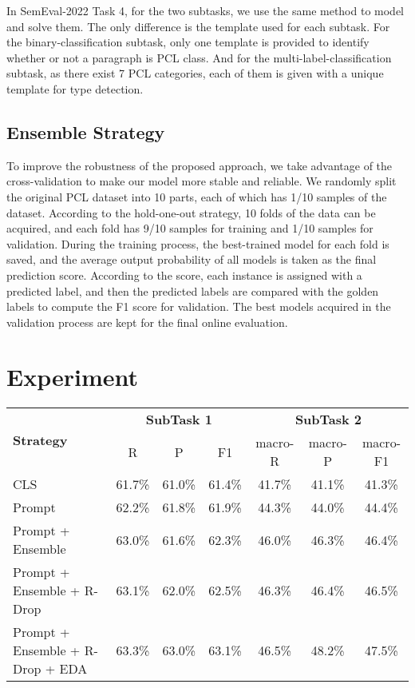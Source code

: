 \documentclass[11pt]{article}
\begin{document}
In SemEval-2022 Task 4, for the two subtasks, we use the same method to model and solve them.
The only difference is the template used for each subtask.
For the binary-classification subtask, only one template is provided to identify whether or not a paragraph is PCL class.
And for the multi-label-classification subtask, as there exist 7 PCL categories,  each of them is given with a unique template for type detection. 

\subsection{Ensemble Strategy}\label{ensemble}
To improve the robustness of the proposed approach, we take advantage of the cross-validation to make our model more stable and reliable. 
We randomly split the original PCL dataset into 10 parts, each of which has 1/10 samples of the dataset.
According to the hold-one-out strategy, 10 folds of the data can be acquired, and each fold has 9/10 samples for training and 1/10 samples for validation.
During the training process, the best-trained model for each fold is saved, and the average output probability of all models is taken as the final prediction score.
According to the score, each instance is assigned with a predicted label, and then the predicted labels are compared with the golden labels to compute the F1 score for validation.
The best models acquired in the validation process are kept for the final online evaluation.


\section{Experiment}

\begin{table*}
\centering
\begin{tabular}{lcccccc}
\hline
\multirow{2}{*}{\textbf{Strategy}} & \multicolumn{3}{c}{\textbf{SubTask 1}} & \multicolumn{3}{c}{\textbf{SubTask 2}} \\
  & R & P & F1 & macro-R & macro-P & macro-F1  \\
\hline
  CLS                                & 61.7\% & 61.0\% & 61.4\% & 41.7\% & 41.1\% & 41.3\%\\
  Prompt                             & 62.2\% & 61.8\% & 61.9\% & 44.3\% & 44.0\% & 44.4\%\\
  Prompt + Ensemble                  & 63.0\% & 61.6\% & 62.3\% & 46.0\% & 46.3\% & 46.4\%\\
  Prompt + Ensemble + R-Drop         & 63.1\% & 62.0\% & 62.5\% & 46.3\% & 46.4\% & 46.5\%\\
  Prompt + Ensemble + R-Drop + EDA   & 63.3\% & 63.0\% & 63.1\% & 46.5\% & 48.2\% & 47.5\%\\
\hline
\end{tabular}
\begin{tabular}{lc}
\hline
\end{tabular}
\caption{Experimental Results on SubTask 1 and SubTask 2}
\label{tab:tab1}
\end{table*}
\end{document}
